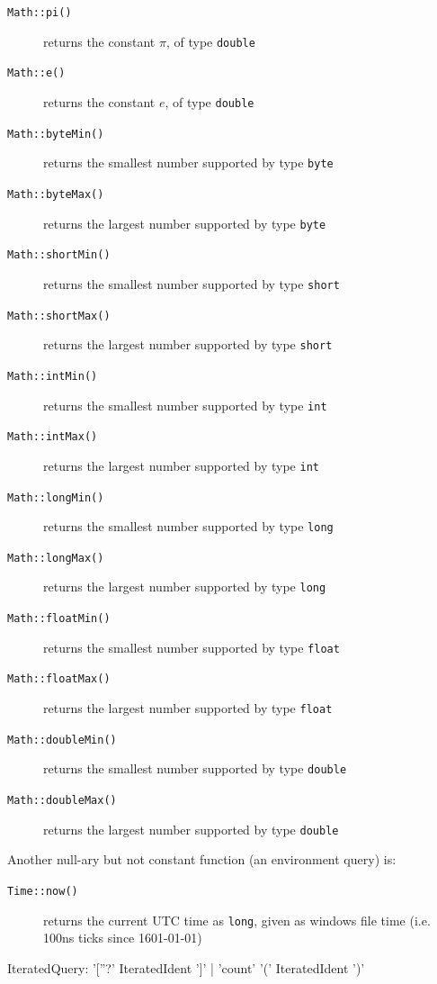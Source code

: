 \begin{description}
\item[\texttt{Math::pi()}] returns the constant $\pi$, of type \texttt{double}
\item[\texttt{Math::e()}] returns the constant $e$, of type \texttt{double}
\item[\texttt{Math::byteMin()}] returns the smallest number supported by type \texttt{byte}
\item[\texttt{Math::byteMax()}] returns the largest number supported by type \texttt{byte}
\item[\texttt{Math::shortMin()}] returns the smallest number supported by type \texttt{short}
\item[\texttt{Math::shortMax()}] returns the largest number supported by type \texttt{short}
\item[\texttt{Math::intMin()}] returns the smallest number supported by type \texttt{int}
\item[\texttt{Math::intMax()}] returns the largest number supported by type \texttt{int}
\item[\texttt{Math::longMin()}] returns the smallest number supported by type \texttt{long}
\item[\texttt{Math::longMax()}] returns the largest number supported by type \texttt{long}
\item[\texttt{Math::floatMin()}] returns the smallest number supported by type \texttt{float}
\item[\texttt{Math::floatMax()}] returns the largest number supported by type \texttt{float}
\item[\texttt{Math::doubleMin()}] returns the smallest number supported by type \texttt{double}
\item[\texttt{Math::doubleMax()}] returns the largest number supported by type \texttt{double}
\end{description}

\noindent Another null-ary but not constant function (an environment query) is:

\begin{description}
\item[\texttt{Time::now()}] returns the current UTC time as \texttt{long}, given as windows file time (i.e. 100ns ticks since 1601-01-01)
\end{description}

\begin{rail}
  IteratedQuery: '[''?' IteratedIdent ']' | 'count' '(' IteratedIdent ')'
\end{rail}

